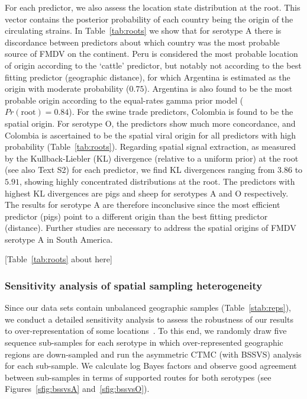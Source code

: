 \documentclass[10pt]{article}
\begin{document}
For each predictor, we also assess the location state distribution at the root. 
This vector contains the posterior probability of each country being the origin of the circulating strains.
In Table~\ref{tab:roots} we show that for serotype A there is discordance between predictors about which country was the most probable source of FMDV on the continent.
Peru is considered the most probable location of origin according to the `cattle' predictor, but notably not according to the best fitting predictor (geographic distance), for which Argentina is estimated as the origin with moderate probability ($0.75$).
Argentina is also found to be the most probable origin according to the equal-rates gamma prior model ($Pr(\text{root})=0.84$).
For the swine trade predictors, Colombia is found to be the spatial origin.
For serotype O, the predictors show much more concordance, and Colombia is ascertained to be the spatial viral origin for all predictors with high probability (Table~\ref{tab:roots}).
Regarding spatial signal extraction, as measured by the Kullback-Liebler (KL) divergence (relative  to a uniform prior) at the root~\cite{roots} (see also Text S2) for each predictor, we find KL divergences ranging from $3.86$ to $5.91$, showing highly concentrated distributions at the root. 
The predictors with highest KL divergences are pigs and sheep for serotypes A and O respectively.
The results for serotype A are therefore inconclusive since the most efficient predictor (pigs) point to a different origin than the best fitting predictor (distance).
Further studies are necessary to address the spatial origins of FMDV serotype A in South America.

\begin{center}
 [Table~\ref{tab:roots} about here]
\end{center}
\subsubsection*{Sensitivity analysis of spatial sampling heterogeneity}

Since our data sets contain unbalanced geographic samples (Table~\ref{stab:reps}), we conduct a detailed sensitivity analysis to assess the robustness of our results to over-representation of some locations~\cite{Faria2012, fluPNAS, Bedford2010, polar}.
To this end, we randomly draw five sequence sub-samples for each serotype in which over-represented geographic regions are down-sampled and run the asymmetric CTMC (with BSSVS) analysis for each sub-sample.
We calculate log Bayes factors and observe good agreement between sub-samples in terms of supported routes for both serotypes (see Figures~\ref{sfig:bssvsA} and~\ref{sfig:bssvsO}). 
\end{document}
